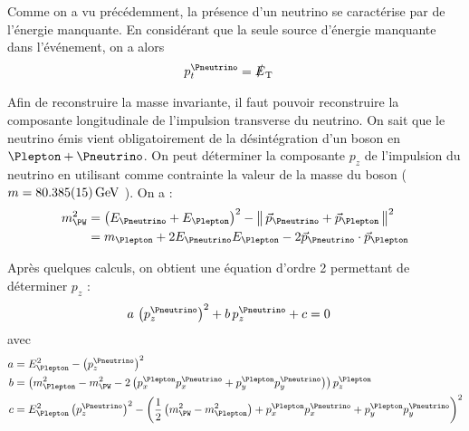 Comme on a vu précédemment, la présence d'un neutrino se caractérise par de l'énergie manquante. En considérant que la seule source d'énergie manquante dans l'événement, on a alors
\begin{align*}
  p_t^{\Pneutrino} &= \met
\end{align*}

Afin de reconstruire la masse invariante, il faut pouvoir reconstruire la composante longitudinale de l'impulsion transverse du neutrino. On sait que le neutrino émis vient obligatoirement de la désintégration d'un boson \PW en $\Plepton + \Pneutrino$. On peut déterminer la composante $p_z$ de l'impulsion du neutrino en utilisant comme contrainte la valeur de la masse du boson \PW ($m = \SI{80.385 \pm 0.015}{\GeV}$ \citep{pdg}). On a :
\begin{align*}
  m_{\PW}^2 &= \left( E_{\Pneutrino} + E_{\Plepton} \right)^2 - \norm{ \vec{p}_{\Pneutrino} + \vec{p}_{\Plepton} }^2 \\
  &= m_{\Plepton} + 2E_{\Pneutrino}E_{\Plepton} - 2 \vec{p}_{\Pneutrino} \cdot \vec{p}_{\Plepton}
\end{align*}

Après quelques calculs, on obtient une équation d'ordre 2 permettant de déterminer $p_z$ :
\begin{align*}
  a \, \left( p_z^{{\Pneutrino}} \right)^2 + b \, p_z^{{\Pneutrino}} + c &= 0
\end{align*}
avec
\begin{align*}
  a &= E_{\Plepton}^2 - \left( p_z^{{\Pneutrino}} \right)^2 \\
  b &= \left( m_{\Plepton}^2 - m_{\PW}^2 - 2 \left( p_x^{\Plepton} p_x^{\Pneutrino} + p_y^{\Plepton} p_y^{\Pneutrino} \right) \right) p_z^{\Plepton} \\
  c &= E_{\Plepton}^2 \left( p_z^{\Pneutrino} \right)^2 - \left( \frac{1}{2} \left( m_{\PW}^2 - m_{\Plepton}^2 \right) + p_x^{\Plepton} p_x^{\Pneutrino} + p_y^{\Plepton} p_y^{\Pneutrino} \right)^2
\end{align*}

